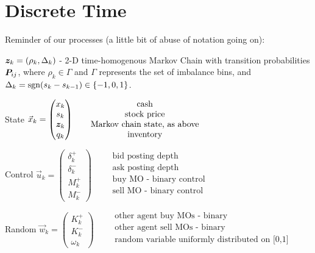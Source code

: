 \section{Discrete Time}
Reminder of our processes (a little bit of abuse of notation going on):

$\bm{z}_k = (\rho_k, \Delta_k)$ - 2-D time-homogenous Markov Chain with transition probabilities $\bm{P}_{ij}$, where $\rho_k \in \Gamma$ and $\Gamma$ represents the set of imbalance bins, and $\Delta_k = \operatorname{\mathrm{sgn}}(s_k - s_{k-1}) \in \{-1,0,1\}$.

State $\vec{x}_{k} = \begin{pmatrix}
x_k \\
s_k \\
\bm{z}_k \\
q_k 
\end{pmatrix} \qquad \begin{matrix}
\text{cash} \\
\text{stock price} \\
\text{Markov chain state, as above} \\
\text{inventory} \\
\end{matrix}$

Control $\vec{u}_{k} = \begin{pmatrix}
\delta_k^+ \\
\delta_k^- \\
M_k^+ \\
M_k^-
\end{pmatrix} \qquad \begin{matrix}
\text{bid posting depth} \\
\text{ask posting depth} \\
\text{buy MO - binary control} \\
\text{sell MO - binary control} \\
\end{matrix}$

Random $\vec{w}_{k} = \begin{pmatrix}
K_k^+ \\
K_k^- \\
\omega_k
\end{pmatrix} \qquad \begin{matrix}
\text{other agent buy MOs - binary} \\
\text{other agent sell MOs - binary} \\
\text{random variable uniformly distributed on [0,1]} \\
\end{matrix}$

